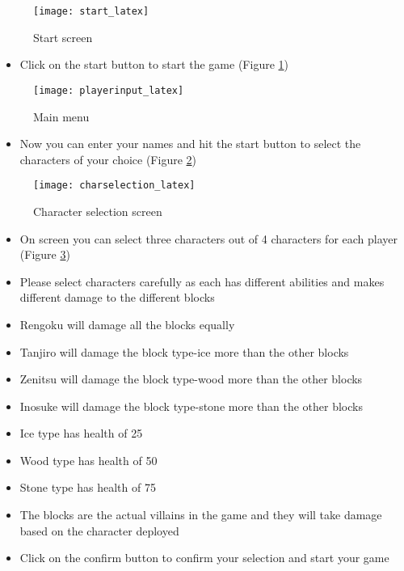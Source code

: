 \documentclass[12pt]{article}
\begin{document}
\begin{figure}[H]
    \centering
    \texttt{[image: start\_latex]}
    \caption{Start screen}
    \label{fig:start}
\end{figure}

\begin{itemize}
    \item Click on the start button to start the game (Figure \ref{fig:start})
\end{itemize}

\begin{figure}[H]
    \centering
    \texttt{[image: playerinput\_latex]}
    \caption{Main menu}
    \label{fig:main_menu}
\end{figure}

\begin{itemize}
    \item Now you can enter your names and hit the start button to select the characters of your choice (Figure \ref{fig:main_menu})
\end{itemize}

\begin{figure}[H]
    \centering
    \texttt{[image: charselection\_latex]}
    \caption{Character selection screen}
    \label{fig:character_selection}
\end{figure}

\begin{itemize}
    \item On screen you can select three characters out of 4 characters for each player (Figure \ref{fig:character_selection})
    \item Please select characters carefully as each has different abilities and makes different damage to the different blocks
    \item Rengoku will damage all the blocks equally 
    \item Tanjiro will damage the block type-ice more than the other blocks 
    \item Zenitsu will damage the block type-wood more than the other blocks
    \item Inosuke will damage the block type-stone more than the other blocks
    \item Ice type has health of 25
    \item Wood type has health of 50
    \item Stone type has health of 75 
    \item The blocks are the actual villains in the game and they will take damage based on the character deployed 
    \item Click on the confirm button to confirm your selection and start your game 
\end{itemize}
\end{document}
